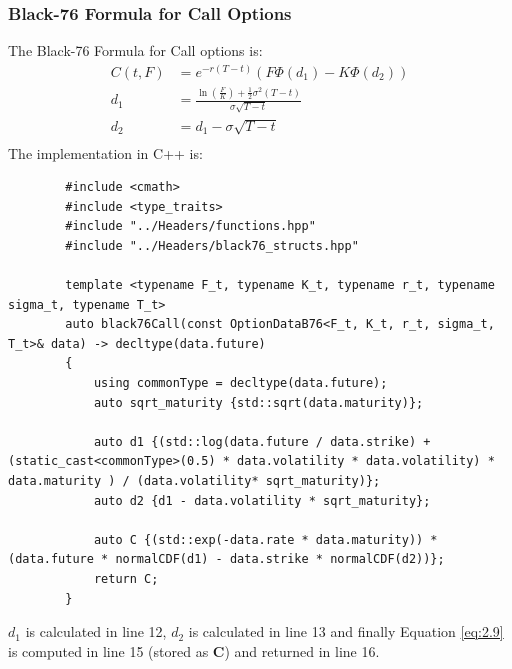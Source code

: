\documentclass[12pt]{article}
\numberwithin{equation}{section}
\begin{document}
\subsubsection{Black-76 Formula for Call Options}
The Black-76 Formula for Call options is:
\begin{equation}
\begin{aligned}
	C (t,F) &= e^{-r(T-t)}(F\Phi(d_1) - K\Phi(d_2)) \\
	d_1 &= \frac{\ln(\frac{F}{K}) + \frac{1}{2}\sigma^2(T-t)}{\sigma \sqrt{T-t}} \\
	d_2 &= d_1 - \sigma \sqrt{T-t} \\
\end{aligned}
\label{eq:2.9}
\end{equation} \cite{black1976CommodityContracts}
The implementation in C++ is:
\begin{listing}[ht]
	\begin{verbatim}
		#include <cmath>
		#include <type_traits>
		#include "../Headers/functions.hpp"
		#include "../Headers/black76_structs.hpp"
		
		template <typename F_t, typename K_t, typename r_t, typename sigma_t, typename T_t>
		auto black76Call(const OptionDataB76<F_t, K_t, r_t, sigma_t, T_t>& data) -> decltype(data.future)
		{
			using commonType = decltype(data.future);
			auto sqrt_maturity {std::sqrt(data.maturity)};
			
			auto d1 {(std::log(data.future / data.strike) + (static_cast<commonType>(0.5) * data.volatility * data.volatility) * data.maturity ) / (data.volatility* sqrt_maturity)};
			auto d2 {d1 - data.volatility * sqrt_maturity};
			
			auto C {(std::exp(-data.rate * data.maturity)) * (data.future * normalCDF(d1) - data.strike * normalCDF(d2))};
			return C;
		}
	\end{verbatim}
	\caption{Black-76 Call using Closed Form Solution}
	\label{lst:b76cF}
\end{listing}
\newline
 $d_1$ is calculated in line 12, $d_2$ is calculated in line 13 and finally Equation \ref{eq:2.9} is computed in line 15 (stored as \textbf{C}) and returned in line 16.
\newpage
\end{document}
